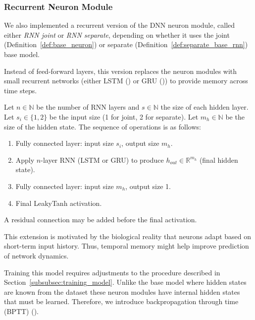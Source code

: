 \subsubsection{Recurrent Neuron Module}
\label{subsubsec:rnn_neuron_module}

We also implemented a recurrent version of the DNN neuron module, called either \emph{RNN joint} or \emph{RNN separate}, depending on whether it uses the joint (Definition~\ref{def:base_neuron}) or separate (Definition~\ref{def:separate_base_rnn}) base model.

Instead of feed-forward layers, this version replaces the neuron modules with small recurrent networks (either LSTM (\citet{hochreiter1997lstm}) or GRU (\citet{cho2014gru})) to provide memory across time steps.

\begin{defn}
    Let $n \in \mathbb{N}$ be the number of RNN layers and $s \in \mathbb{N}$ the size of each hidden layer. Let $s_i \in \{1, 2\}$ be the input size (1 for joint, 2 for separate). Let $m_h \in \mathbb{N}$ be the size of the hidden state. The sequence of operations is as follows:
    
    \begin{enumerate}
        \item Fully connected layer: input size $s_i$, output size $m_h$.
        \item Apply $n$-layer RNN (LSTM or GRU) to produce $h_{out} \in \mathbb{R}^{m_h}$ (final hidden state).
        \item Fully connected layer: input size $m_h$, output size 1.
        \item Final LeakyTanh activation.
    \end{enumerate}
    
    A residual connection may be added before the final activation.
\end{defn}
\label{def:rnn_neuron_module}

This extension is motivated by the biological reality that neurons adapt based on short-term input history. Thus, temporal memory might help improve prediction of network dynamics.

Training this model requires adjustments to the procedure described in Section~\ref{subsubsec:training_model}. Unlike the base model where hidden states are known from the dataset these neuron modules have internal hidden states that must be learned. Therefore, we introduce backpropagation through time (BPTT) (\citet{webos1990btt}).


